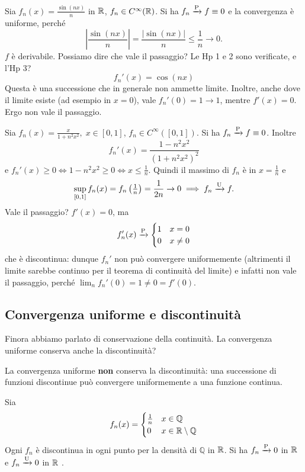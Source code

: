 \begin{example}
    Sia \(f_{n}(x)=\frac{\sin(nx)}{n}\) in \(\mathbb{R}\), \(f_{n}\in C^{\infty}(\mathbb{R})\).
    Si ha \(f_{n}\xrightarrow{\mathrm{P}} f\equiv 0\) e la convergenza è uniforme, perché
    \[
    \left|\frac{\sin(nx)}{n}\right| = \frac{|\sin(nx)|}{n} \leq \frac{1}{n}\to 0 .
    \]
    \(f\) è derivabile. Possiamo dire che vale il passaggio? Le Hp 1 e 2 sono verificate, e l'Hp 3?
    \[
    f_{n}'(x)=\cos(nx)
    \]
    Questa è una successione che in generale non ammette limite. Inoltre, anche dove il limite esiste (ad esempio in \(x=0\)), vale \(f_{n}'(0)=1\to 1\), mentre \(f'(x)=0\).
    Ergo non vale il passaggio.
\end{example}

\begin{example}
    Sia \(f_{n}(x)=\frac{x}{1+n^{2}x^{2}}, \; x\in[0,1]\), \(f_{n}\in C^{\infty}([0,1])\).
    Si ha \(f_{n}\xrightarrow{\mathrm{P}} f\equiv 0\). Inoltre
    \[
    f_{n}'(x)=\frac{1-n^{2}x^{2}}{(1+n^{2}x^{2})^{2}}
    \]
    e \(f_{n}'(x)\geq 0 \iff 1-n^{2}x^{2}\geq 0 \iff x\leq \frac{1}{n}\).
    Quindi il massimo di \(f_{n}\) è in \(x=\frac{1}{n}\) e
    \[
    \sup_{[0,1]} f_{n}(x) = f_{n}\left(\tfrac{1}{n}\right) = \frac{1}{2n}\to 0 \implies f_{n}\xrightarrow{\mathrm{U}} f .
    \]
    Vale il passaggio? \(f'(x)=0\), ma
    \[
    f_{n}'(x)\xrightarrow{\mathrm{P}}\begin{cases} 1 & x=0 \\ 0 & x\neq 0 \end{cases}
    \]
    che è discontinua: dunque \(f_{n}'\) non può convergere uniformemente (altrimenti il limite sarebbe continuo per il teorema di continuità del limite) e infatti non vale il passaggio, perché \(\lim_{n}f_{n}'(0)=1\neq 0=f'(0)\).
\end{example}


\subsection{Convergenza uniforme e discontinuità}
Finora abbiamo parlato di conservazione della continuità. La convergenza uniforme conserva anche la discontinuità?

\begin{oss}
    La convergenza uniforme \textbf{non} conserva la discontinuità: una successione di funzioni discontinue può convergere uniformemente a una funzione continua.
\end{oss}

\begin{example}
    Sia
    \[
    f_{n}(x)=\begin{cases} \frac{1}{n} & x\in\mathbb{Q} \\ 0 & x\in\mathbb{R}\setminus\mathbb{Q} \end{cases}
    \]
    Ogni \(f_{n}\) è discontinua in ogni punto per la densità di \(\mathbb{Q}\) in \(\mathbb{R}\).
    Si ha \(f_{n}\xrightarrow{\mathrm{P}}0\) in \(\mathbb{R}\) e \(f_{n}\xrightarrow{\mathrm{U}}0\) in \(\mathbb{R}\) .
\end{example}


